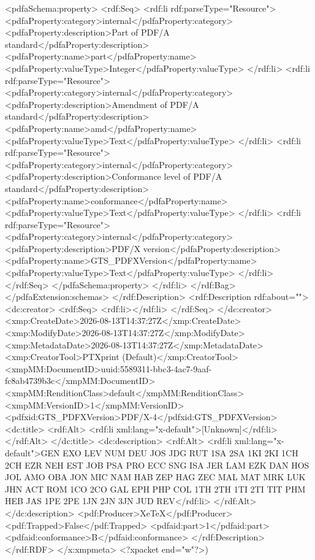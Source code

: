 {              <pdfaSchema:property>
                <rdf:Seq>
                  <rdf:li rdf:parseType="Resource">
                    <pdfaProperty:category>internal</pdfaProperty:category>
                    <pdfaProperty:description>Part of PDF/A standard</pdfaProperty:description>
                    <pdfaProperty:name>part</pdfaProperty:name>
                    <pdfaProperty:valueType>Integer</pdfaProperty:valueType>
                  </rdf:li>
                  <rdf:li rdf:parseType="Resource">
                    <pdfaProperty:category>internal</pdfaProperty:category>
                    <pdfaProperty:description>Amendment of PDF/A standard</pdfaProperty:description>
                    <pdfaProperty:name>amd</pdfaProperty:name>
                    <pdfaProperty:valueType>Text</pdfaProperty:valueType>
                  </rdf:li>
                  <rdf:li rdf:parseType="Resource">
                    <pdfaProperty:category>internal</pdfaProperty:category>
                    <pdfaProperty:description>Conformance level of PDF/A standard</pdfaProperty:description>
                    <pdfaProperty:name>conformance</pdfaProperty:name>
                    <pdfaProperty:valueType>Text</pdfaProperty:valueType>
                  </rdf:li>
                  <rdf:li rdf:parseType="Resource">
                    <pdfaProperty:category>internal</pdfaProperty:category>
                    <pdfaProperty:description>PDF/X version</pdfaProperty:description>
                    <pdfaProperty:name>GTS_PDFXVersion</pdfaProperty:name>
                    <pdfaProperty:valueType>Text</pdfaProperty:valueType>
                  </rdf:li>
                </rdf:Seq>
              </pdfaSchema:property>
            </rdf:li>
          </rdf:Bag>
        </pdfaExtension:schemas>
      </rdf:Description>
      <rdf:Description rdf:about="">
        <dc:creator>
          <rdf:Seq>
            <rdf:li></rdf:li>
          </rdf:Seq>
        </dc:creator>
        <xmp:CreateDate>2026-08-13T14:37:27Z</xmp:CreateDate>
        <xmp:ModifyDate>2026-08-13T14:37:27Z</xmp:ModifyDate>
        <xmp:MetadataDate>2026-08-13T14:37:27Z</xmp:MetadataDate>
        <xmp:CreatorTool>PTXprint (Default)</xmp:CreatorTool>
        <xmpMM:DocumentID>uuid:5589311-bbc3-4ac7-9aaf-fc8ab4739b3c</xmpMM:DocumentID>
        <xmpMM:RenditionClass>default</xmpMM:RenditionClass>
        <xmpMM:VersionID>1</xmpMM:VersionID>
        <pdfxid:GTS_PDFXVersion>PDF/X-4</pdfxid:GTS_PDFXVersion>
        <dc:title>
          <rdf:Alt>
            <rdf:li xml:lang="x-default">[Unknown]</rdf:li>
          </rdf:Alt>
        </dc:title>
        <dc:description>
          <rdf:Alt>
            <rdf:li xml:lang="x-default">GEN EXO LEV NUM DEU JOS JDG RUT 1SA 2SA 1KI 2KI 1CH 2CH EZR NEH EST JOB PSA PRO ECC SNG ISA JER LAM EZK DAN HOS JOL AMO OBA JON MIC NAM HAB ZEP HAG ZEC MAL MAT MRK LUK JHN ACT ROM 1CO 2CO GAL EPH PHP COL 1TH 2TH 1TI 2TI TIT PHM HEB JAS 1PE 2PE 1JN 2JN 3JN JUD REV</rdf:li>
          </rdf:Alt>
        </dc:description>
        <pdf:Producer>XeTeX</pdf:Producer>
        <pdf:Trapped>False</pdf:Trapped>
      <pdfaid:part>1</pdfaid:part>
      <pdfaid:conformance>B</pdfaid:conformance>
      </rdf:Description>
  </rdf:RDF>
</x:xmpmeta>
<?xpacket end="w"?>)}
